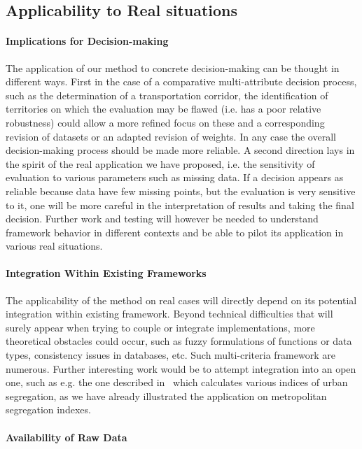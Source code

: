 \documentclass[runningheads,a4paper]{llncs2e/llncs}
\begin{document}
\subsection{Applicability to Real situations}


\paragraph{Implications for Decision-making}

The application of our method to concrete decision-making can be thought in different ways. First in the case of a comparative multi-attribute decision process, such as the determination of a transportation corridor, the identification of territories on which the evaluation may be flawed (i.e. has a poor relative robustness) could allow a more refined focus on these and a corresponding revision of datasets or an adapted revision of weights. In any case the overall decision-making process should be made more reliable. A second direction lays in the spirit of the real application we have proposed, i.e. the sensitivity of evaluation to various parameters such as missing data. If a decision appears as reliable because data have few missing points, but the evaluation is very sensitive to it, one will be more careful in the interpretation of results and taking the final decision. Further work and testing will however be needed to understand framework behavior in different contexts and be able to pilot its application in various real situations.

\paragraph{Integration Within Existing Frameworks}

The applicability of the method on real cases will directly depend on its potential integration within existing framework. Beyond technical difficulties that will surely appear when trying to couple or integrate implementations, more theoretical obstacles could occur, such as fuzzy formulations of functions or data types, consistency issues in databases, etc. Such multi-criteria framework are numerous. Further interesting work would be to attempt integration into an open one, such as e.g. the one described in~\cite{tivadar2014oasis} which calculates various indices of urban segregation, as we have already illustrated the application on metropolitan segregation indexes.


\paragraph{Availability of Raw Data}
\end{document}
